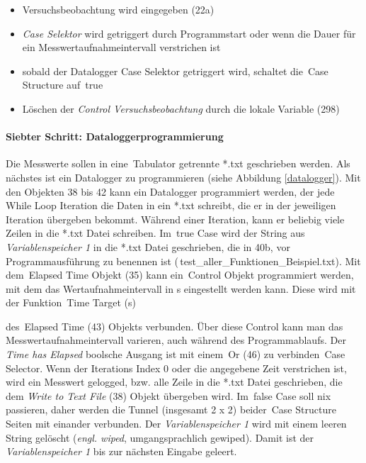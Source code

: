{\begin{itemize} %
\singlespacing
\item Versuchsbeobachtung wird eingegeben (22a)
\item \textit{Case Selektor} wird getriggert durch Programmstart oder wenn die Dauer für ein Messwertaufnahmeintervall verstrichen ist
\item sobald der Datalogger Case Selektor getriggert wird, schaltet die \,{\Menlo Case Structure} auf \,{\Menlo true}
\item Löschen der \textit{Control Versuchsbeobachtung} durch die lokale Variable (298) 
\end{itemize}


\paragraph{Siebter Schritt: Dataloggerprogrammierung}
\label{sec:Datalogger}

Die Messwerte sollen in eine \,{\Menlo Tabulator} getrennte *.txt geschrieben werden. Als nächstes ist ein Datalogger zu programmieren (siehe Abbildung \ref{datalogger}). Mit den Objekten 38 bis 42 kann ein Datalogger programmiert werden, der jede \,{\Menlo While Loop} Iteration die Daten in ein *.txt schreibt, die er in der jeweiligen Iteration übergeben bekommt. Während einer Iteration, kann er beliebig viele Zeilen in die *.txt Datei schreiben. Im \,{\Menlo true} Case wird der String aus \textit{Variablenspeicher 1} in die *.txt Datei geschrieben, die in 40b, vor Programmausführung zu benennen ist (\,{\Menlo test\_aller\_Funktionen\_Beispiel.txt}). Mit dem \,{\Menlo Elapsed Time} Objekt (35) kann ein \,{\Menlo Control} Objekt programmiert werden, mit dem das Wertaufnahmeintervall in s eingestellt werden kann. Diese wird mit der Funktion \,{\Menlo Time Target} (s)} des \,{\Menlo Elapsed Time} (43) Objekts verbunden. Über diese Control kann man das Messwertaufnahmeintervall varieren, auch während des Programmablaufs. Der \textit{Time has Elapsed} boolsche Ausgang ist mit einem \,{\Menlo Or} (46) zu verbinden \,{\Menlo Case Selector}. Wenn der Iterations Index 0 oder die angegebene Zeit verstrichen ist, wird ein Messwert gelogged, bzw. alle Zeile in die *.txt Datei geschrieben, die dem \textit{Write to Text File} (38) Objekt übergeben wird. Im \,{\Menlo false} Case soll nix passieren, daher werden die Tunnel (insgesamt 2 x 2) beider \,{\Menlo Case Structure} Seiten mit einander verbunden. Der \textit{Variablenspeicher 1} wird mit einem leeren String gelöscht (\textit{engl. wiped}, umgangsprachlich gewiped). Damit ist der \textit{Variablenspeicher 1} bis zur nächsten Eingabe geleert.

